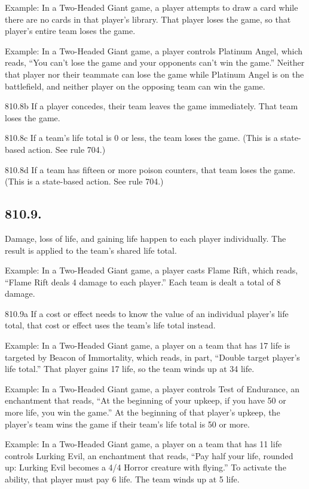Example: In a Two-Headed Giant game, a player attempts to draw a card while there are no cards in that player’s library. That player loses the game, so that player’s entire team loses the game.

Example: In a Two-Headed Giant game, a player controls Platinum Angel, which reads, “You can’t lose the game and your opponents can’t win the game.” Neither that player nor their teammate can lose the game while Platinum Angel is on the battlefield, and neither player on the opposing team can win the game.

810.8b If a player concedes, their team leaves the game immediately. That team loses the game.

810.8c If a team’s life total is 0 or less, the team loses the game. (This is a state-based action. See rule 704.)

810.8d If a team has fifteen or more poison counters, that team loses the game. (This is a state-based action. See rule 704.)

\subsection*{810.9.}
Damage, loss of life, and gaining life happen to each player individually. The result is applied to the team’s shared life total.

Example: In a Two-Headed Giant game, a player casts Flame Rift, which reads, “Flame Rift deals 4 damage to each player.” Each team is dealt a total of 8 damage.

810.9a If a cost or effect needs to know the value of an individual player’s life total, that cost or effect uses the team’s life total instead.

Example: In a Two-Headed Giant game, a player on a team that has 17 life is targeted by Beacon of Immortality, which reads, in part, “Double target player’s life total.” That player gains 17 life, so the team winds up at 34 life.

Example: In a Two-Headed Giant game, a player controls Test of Endurance, an enchantment that reads, “At the beginning of your upkeep, if you have 50 or more life, you win the game.” At the beginning of that player’s upkeep, the player’s team wins the game if their team’s life total is 50 or more.

Example: In a Two-Headed Giant game, a player on a team that has 11 life controls Lurking Evil, an enchantment that reads, “Pay half your life, rounded up: Lurking Evil becomes a 4/4 Horror creature with flying.” To activate the ability, that player must pay 6 life. The team winds up at 5 life.

